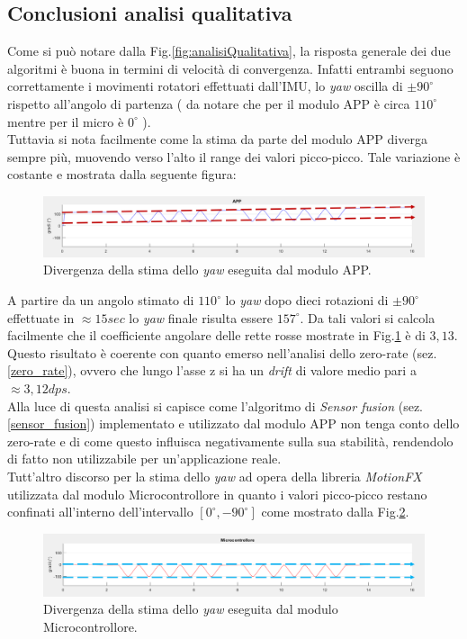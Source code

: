 \subsection{Conclusioni analisi qualitativa}
Come si può notare dalla Fig.\ref{fig:analisiQualitativa}, la risposta generale dei due algoritmi è buona in termini di velocità di convergenza. Infatti entrambi seguono correttamente i movimenti rotatori effettuati dall'IMU, lo \textit{yaw} oscilla di $\pm 90^{\circ}$ rispetto all'angolo di partenza ( da notare che per il modulo APP è circa  $ 110^{\circ}$ mentre per il micro è  $0^{\circ}$ ).\\
Tuttavia si nota facilmente come la stima da parte del modulo APP diverga sempre più, muovendo verso l'alto il range dei valori picco-picco. Tale variazione è costante e mostrata dalla seguente figura:
\begin{figure}[H]  
	\centering 
	\includegraphics[scale=0.35]{analisi/analisiQualitativaApp.png}
	\caption{Divergenza della stima dello \textit{yaw} eseguita dal modulo APP.}
	\label{fig:analisiQualitativaApp}
\end{figure}
A partire da un angolo stimato di $ 110^{\circ}$ lo \textit{yaw} dopo dieci rotazioni di $\pm 90^{\circ}$ effettuate in $\approx 15 sec$ lo \textit{yaw} finale risulta essere  $ 157^{\circ}$. Da tali valori si calcola facilmente che il coefficiente angolare delle rette rosse mostrate in Fig.\ref{fig:analisiQualitativaApp} è di $3,13$. 
Questo risultato è coerente con quanto emerso nell'analisi dello zero-rate (sez.\ref{zero_rate}), ovvero che lungo l'asse z si ha un \textit{drift} di valore medio pari a $\approx 3,12 dps$.\\
Alla luce di questa analisi si capisce come l'algoritmo di \textit{Sensor fusion} (sez.\ref{sensor_fusion}) implementato e utilizzato dal modulo APP non tenga conto dello zero-rate e di come questo influisca negativamente sulla sua stabilità, rendendolo di fatto non utilizzabile per un'applicazione reale.\\ 
 Tutt'altro discorso per la stima dello \textit{yaw} ad opera della libreria \textit{MotionFX} utilizzata dal modulo Microcontrollore in quanto i valori picco-picco restano confinati all'interno dell'intervallo $[0^{\circ},-90^{\circ}]$ come mostrato dalla Fig.\ref{fig:analisiQualitativaStm}. 
 \begin{figure}[H]  
 	\centering 
 	\includegraphics[scale=0.35]{analisi/analisiQualitativaStm.png}
 	\caption{Divergenza della stima dello \textit{yaw} eseguita dal modulo Microcontrollore.}
 	\label{fig:analisiQualitativaStm}
 \end{figure}




